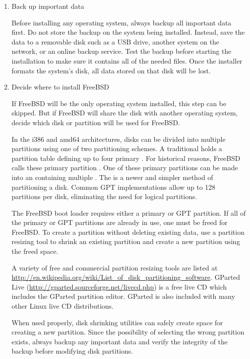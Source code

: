 \begin{enumerate}
\item
   Back up important data

   Before installing any operating system, always backup all important data first.
   Do not store the backup on the system being installed.
   Instead, save the data to a removable disk such as a USB drive, another system on the network, or an online backup service.
   Test the backup before starting the installation to make sure it contains all of the needed files.
   Once the installer formats the system's disk, all data stored on that disk will be lost.
\item 
   Decide where to install FreeBSD

   If FreeBSD will be the only operating system installed, this step can be skipped.
   But if FreeBSD will share the disk with another operating system, decide which disk or partition will be used for FreeBSD.

   In the i386 and amd64 architectures, disks can be divided into multiple partitions using one of two partitioning schemes.
   A traditional  holds a partition table defining up to four primary .
   For historical reasons, FreeBSD calls these primary partition .
   One of these primary partitions can be made into an  containing multiple .
   The  is a newer and simpler method of partitioning a disk.
   Common GPT implementations allow up to 128 partitions per disk, eliminating the need for logical partitions.

   The FreeBSD boot loader requires either a primary or GPT partition.
   If all of the primary or GPT partitions are already in use, one must be freed for FreeBSD.
   To create a partition without deleting existing data, use a partition resizing tool to shrink an existing partition and create a new partition using the freed space.

   A variety of free and commercial partition resizing tools are listed at \url{http://en.wikipedia.org/wiki/List_of_disk_partitioning_software}.
   GParted Live (\url{http://gparted.sourceforge.net/livecd.php}) is a free live CD which includes the GParted partition editor.
   GParted is also included with many other Linux live CD distributions.

   \begin{warning}
   When used properly, disk shrinking utilities can safely create space for creating a new partition.
   Since the possibility of selecting the wrong partition exists, always backup any important data and verify the integrity of the backup before modifying disk partitions.
   \end{warning}


\end{enumerate}
